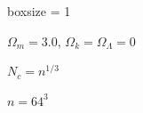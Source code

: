 \documentclass[10pt]{article}
\begin{document}
\begin{figure}[htbp]
\centering

\caption{boxsize = 1}
\label{fig:1boxsize}
\end{figure}

\begin{figure}[htbp]
\centering

\caption{$\Omega_m = 3.0$, $\Omega_k = \Omega_\Lambda = 0$}
\label{fig:3mass}
\end{figure}

\begin{figure}[htbp]
\centering

\caption{$N_c = n^{1/3}$}
\label{fig:1ncells}
\end{figure}

\begin{figure}[htbp]
\centering

\caption{$n = 64^3$}
\label{fig:n64}
\end{figure}
\end{document}
